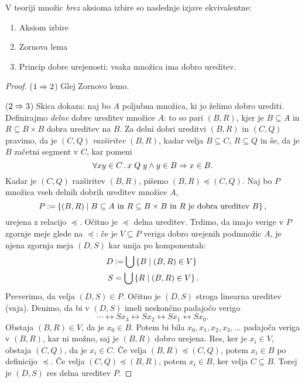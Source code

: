 \begin{izrek}
  V teoriji množic \emph{brez} aksioma izbire so naslednje izjave ekvivalentne:
  \begin{enumerate}
  \item Aksiom izbire
  \item Zornova lema
  \item Princip dobre urejenosti: vsaka množica ima dobro ureditev.
  \end{enumerate}
\end{izrek}

\begin{proof}
  ($1 \Rightarrow 2$) Glej Zornovo lemo.

  ($2 \Rightarrow 3$) Skica dokaza: naj bo $A$ poljubna množica, ki jo želimo dobro urediti.
  Definirajmo \emph{delne} dobre ureditev množice $A$: to so pari $(B,R)$, kjer je $B \subseteq A$
  in $R \subseteq B \times B$ dobra ureditev na $B$. Za delni dobri ureditvi $(B,R)$ in
  $(C,Q)$ pravimo, da je $(C,Q)$ \emph{razširitev} $(B,R)$, kadar velja $B \subseteq C$, $R \subseteq Q$ in
  še, da je $B$ začetni segment v $C$, kar pomeni
  \begin{equation*}
    \forall x y \in C \,.\, x \mathrel{Q} y \land y \in B \Rightarrow x \in B.
  \end{equation*}
  Kadar je $(C,Q)$ razširitev $(B,R)$, pišemo $(B,R) \preceq (C,Q)$. Naj bo $P$ množica vseh delnih
  dobrih ureditev množice $A$,
  \begin{equation*}
    P \mathbin{{:}{=}} \left\{ (B, R) \mid \text{$B \subseteq A$ in $R \subseteq B \times B$ in $R$ je dobra ureditev $B$}\right\},
  \end{equation*}
  urejena z relacijo $\preceq$. Očitno je $\preceq$ delna ureditev. Trdimo, da imajo verige v
  $P$ zgornje meje glede na $\preceq$: če je $V \subseteq P$ veriga dobro urejenih podmnožic
  $A$, je njena zgornja meja $(D,S)$ kar unija po komponentah:
  \begin{align*}
    D &\mathbin{{:}{=}} \bigcup \left\{B \mid (B, R) \in V\right\} \\
    S &= \bigcup \left\{R \mid (B, R) \in V\right\}.
  \end{align*}
  Preverimo, da velja $(D,S) \in P$. Očitno je $(D,S)$ stroga linearna ureditev
  (vaja). Denimo, da bi v $(D,S)$ imeli neskončno padajočo verigo
  \begin{equation*}
    \cdots \rel{S} x_3 \rel{S} x_2 \rel{S} x_1 \rel{S} x_0.
  \end{equation*}
  Obstaja $(B,R) \in V$, da je $x_0 \in B$. Potem bi bila $x_0, x_1, x_2, x_3, \ldots$
  padajoča veriga v $(B,R)$, kar ni možno, saj je $(B,R)$ dobro urejena. Res, ker
  je $x_i \in V$, obstaja $(C,Q)$, da je $x_i \in C$. Če velja $(B,R) \preceq (C,Q)$, potem
  $x_i \in B$ po definicijo $\preceq$. Če velja $(C,Q) \preceq (B,R)$, potem $x_i \in B$, ker velja
  $C \subseteq B$. Torej je $(D,S)$ res delna ureditev $P$.


\end{proof}
